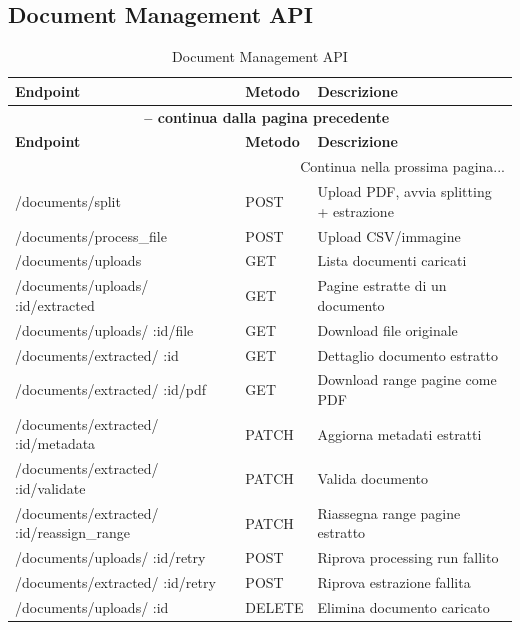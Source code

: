 \documentclass[a4paper,11pt]{article}
\begin{document}
\subsection{Document Management API}
\begin{longtable}{|p{4cm}|p{2cm}|p{7cm}|}
\caption{Document Management API}\label{tab:document_management_api}\\
\hline
\rowcolor{primaryblue!40}
\textbf{Endpoint} & \textbf{Metodo} & \textbf{Descrizione} \\
\hline
\endfirsthead

\multicolumn{3}{c}{{\bfseries \tablename\ \thetable{} -- continua dalla pagina precedente}}\\
\hline
\rowcolor{primaryblue!40}
\textbf{Endpoint} & \textbf{Metodo} & \textbf{Descrizione} \\
\hline
\endhead

\hline
\multicolumn{3}{|r|}{{Continua nella prossima pagina...}}\\
\hline
\endfoot

\hline
\endlastfoot

/documents/split & POST & Upload PDF, avvia splitting + estrazione \\
\hline
/documents/process\_file & POST & Upload CSV/immagine \\
\hline
/documents/uploads & GET & Lista documenti caricati \\
\hline
/documents/uploads/ :id/extracted & GET & Pagine estratte di un documento \\
\hline
/documents/uploads/ :id/file & GET & Download file originale \\
\hline
/documents/extracted/ :id & GET & Dettaglio documento estratto \\
\hline
/documents/extracted/ :id/pdf & GET & Download range pagine come PDF \\
\hline
/documents/extracted/ :id/metadata & PATCH & Aggiorna metadati estratti \\
\hline
/documents/extracted/ :id/validate & PATCH & Valida documento \\
\hline
/documents/extracted/ :id/reassign\_range & PATCH & Riassegna range pagine estratto \\
\hline
/documents/uploads/ :id/retry & POST & Riprova processing run fallito \\
\hline
/documents/extracted/ :id/retry & POST & Riprova estrazione fallita \\
\hline
/documents/uploads/ :id & DELETE & Elimina documento caricato \\
\hline
\end{longtable}
\end{document}
